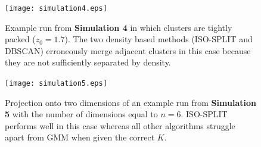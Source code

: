 \documentclass[10pt]{article}
\begin{document}
\begin{figure}
\begin{center}
\texttt{[image: simulation4.eps]}
\end{center}
\caption{
Example run from \textbf{Simulation 4} in which clusters are tightly packed ($z_0=1.7$). The two density based methods (ISO-SPLIT and DBSCAN) erroneously merge adjacent clusters in this case because they are not sufficiently separated by density.
}
\label{fig:simulation4}
\end{figure}

\begin{figure}
\begin{center}
\texttt{[image: simulation5.eps]}
\end{center}
\caption{
Projection onto two dimensions of an example run from \textbf{Simulation 5} with the number of dimensions equal to $n=6$. ISO-SPLIT performs well in this case whereas all other algorithms struggle apart from GMM when given the correct $K$.
}
\label{fig:simulation5}
\end{figure}

\newcommand{\multicell}[2][c]{%
  \begin{tabular}[#1]{@{}l@{}}#2\end{tabular}}
\end{document}
